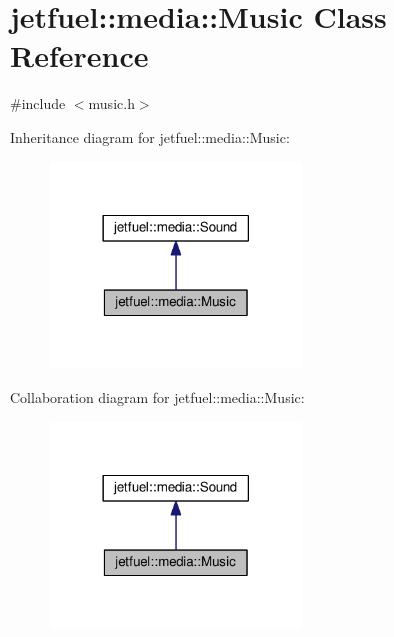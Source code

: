 \hypertarget{classjetfuel_1_1media_1_1Music}{}\section{jetfuel\+:\+:media\+:\+:Music Class Reference}
\label{classjetfuel_1_1media_1_1Music}


{\ttfamily \#include $<$music.\+h$>$}



Inheritance diagram for jetfuel\+:\+:media\+:\+:Music\+:\nopagebreak
\begin{figure}[H]
\begin{center}
\leavevmode
\includegraphics[width=189pt]{classjetfuel_1_1media_1_1Music__inherit__graph}
\end{center}
\end{figure}


Collaboration diagram for jetfuel\+:\+:media\+:\+:Music\+:\nopagebreak
\begin{figure}[H]
\begin{center}
\leavevmode
\includegraphics[width=189pt]{classjetfuel_1_1media_1_1Music__coll__graph}
\end{center}
\end{figure}
